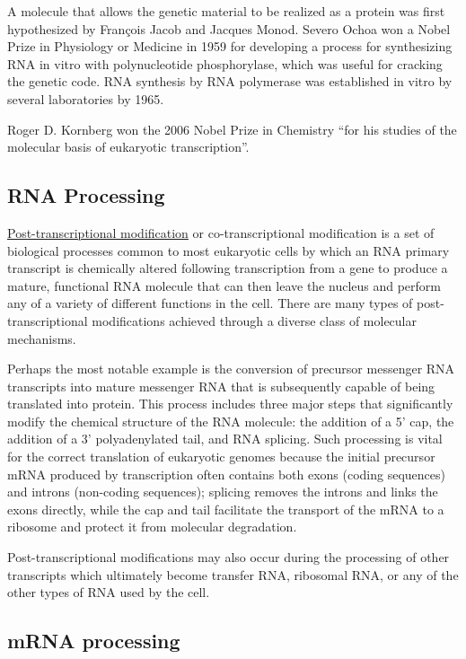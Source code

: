 A molecule that allows the genetic material to be realized as a protein was first hypothesized by François Jacob and Jacques Monod. Severo Ochoa won a Nobel Prize in Physiology or Medicine in 1959 for developing a process for synthesizing RNA in vitro with polynucleotide phosphorylase, which was useful for cracking the genetic code. RNA synthesis by RNA polymerase was established in vitro by several laboratories by 1965.

Roger D. Kornberg won the 2006 Nobel Prize in Chemistry ``for his studies of the molecular basis of eukaryotic transcription''.

\hypertarget{rna-processing}{%
\subsection{RNA Processing}\label{rna-processing}}

\href{https://en.wikipedia.org/wiki/Post-transcriptional_modification}{Post-transcriptional modification} or co-transcriptional modification is a set of biological processes common to most eukaryotic cells by which an RNA primary transcript is chemically altered following transcription from a gene to produce a mature, functional RNA molecule that can then leave the nucleus and perform any of a variety of different functions in the cell. There are many types of post-transcriptional modifications achieved through a diverse class of molecular mechanisms.

Perhaps the most notable example is the conversion of precursor messenger RNA transcripts into mature messenger RNA that is subsequently capable of being translated into protein. This process includes three major steps that significantly modify the chemical structure of the RNA molecule: the addition of a 5' cap, the addition of a 3' polyadenylated tail, and RNA splicing. Such processing is vital for the correct translation of eukaryotic genomes because the initial precursor mRNA produced by transcription often contains both exons (coding sequences) and introns (non-coding sequences); splicing removes the introns and links the exons directly, while the cap and tail facilitate the transport of the mRNA to a ribosome and protect it from molecular degradation.

Post-transcriptional modifications may also occur during the processing of other transcripts which ultimately become transfer RNA, ribosomal RNA, or any of the other types of RNA used by the cell.

\hypertarget{mrna-processing}{%
\subsection{mRNA processing}\label{mrna-processing}}

